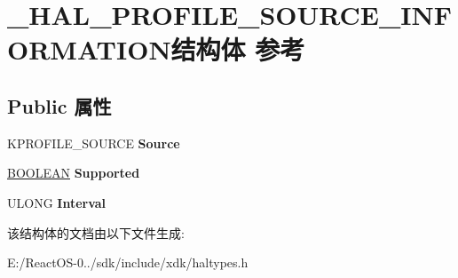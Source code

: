 \hypertarget{struct___h_a_l___p_r_o_f_i_l_e___s_o_u_r_c_e___i_n_f_o_r_m_a_t_i_o_n}{}\section{\+\_\+\+H\+A\+L\+\_\+\+P\+R\+O\+F\+I\+L\+E\+\_\+\+S\+O\+U\+R\+C\+E\+\_\+\+I\+N\+F\+O\+R\+M\+A\+T\+I\+O\+N结构体 参考}
\label{struct___h_a_l___p_r_o_f_i_l_e___s_o_u_r_c_e___i_n_f_o_r_m_a_t_i_o_n}
\subsection*{Public 属性}
\begin{DoxyCompactItemize}
\item 
\mbox{\label{struct___h_a_l___p_r_o_f_i_l_e___s_o_u_r_c_e___i_n_f_o_r_m_a_t_i_o_n_a640e38b01dd079e584294afb6e76e24b}} 
K\+P\+R\+O\+F\+I\+L\+E\+\_\+\+S\+O\+U\+R\+CE {\bfseries Source}
\item 
\mbox{\label{struct___h_a_l___p_r_o_f_i_l_e___s_o_u_r_c_e___i_n_f_o_r_m_a_t_i_o_n_afd44ee0b54d12ee20bb97b9b627a04fd}} 
\hyperlink{_processor_bind_8h_a112e3146cb38b6ee95e64d85842e380a}{B\+O\+O\+L\+E\+AN} {\bfseries Supported}
\item 
\mbox{\label{struct___h_a_l___p_r_o_f_i_l_e___s_o_u_r_c_e___i_n_f_o_r_m_a_t_i_o_n_ae09c9ccd8619977416b9baee675eff14}} 
U\+L\+O\+NG {\bfseries Interval}
\end{DoxyCompactItemize}


该结构体的文档由以下文件生成\+:\begin{DoxyCompactItemize}
\item 
E\+:/\+React\+O\+S-\/0../sdk/include/xdk/haltypes.\+h\end{DoxyCompactItemize}
